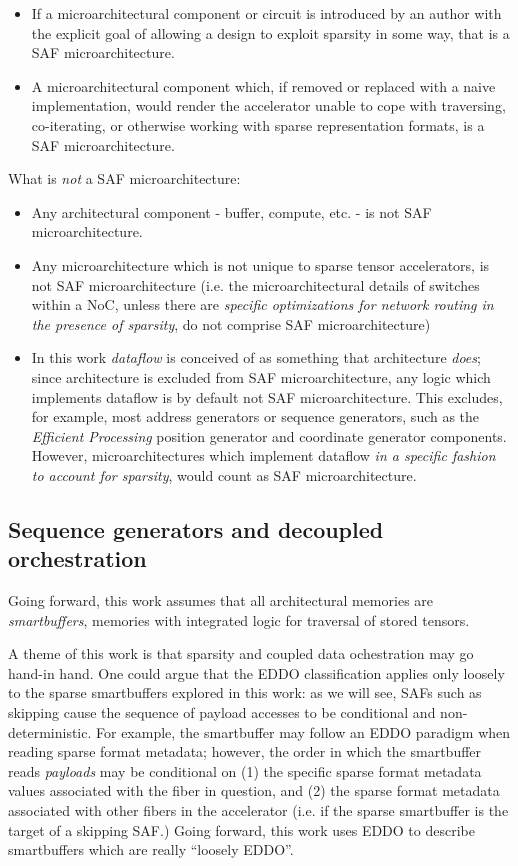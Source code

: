 \begin{itemize}
    \item If a microarchitectural component or circuit is introduced by an author with the explicit goal of allowing a design to exploit sparsity in some way, that is a SAF microarchitecture.
    \item A microarchitectural component which, if removed or replaced with a naive implementation, would render the accelerator unable to cope with traversing, co-iterating, or otherwise working with sparse representation formats, is a SAF microarchitecture.
\end{itemize}

What is \textit{not} a SAF microarchitecture:

\begin{itemize}
    \item Any architectural component - buffer, compute, etc. - is not SAF microarchitecture.
    \item Any microarchitecture which is not unique to sparse tensor accelerators, is not SAF microarchitecture (i.e. the microarchitectural details of switches within a NoC, unless there are \textit{specific optimizations for network routing in the presence of sparsity}, do not comprise SAF microarchitecture)
    \item In this work \textit{dataflow} is conceived of as something that architecture \textit{does}; since architecture is excluded from SAF microarchitecture, any logic which implements dataflow is by default not SAF microarchitecture. This excludes, for example, most address generators or sequence generators, such as the \textit{Efficient Processing} position generator and coordinate generator components. However, microarchitectures which implement dataflow \textit{in a specific fashion to account for sparsity}, would count as SAF microarchitecture.
\end{itemize}

\subsection{Sequence generators and decoupled orchestration}

Going forward, this work assumes that all architectural memories are \textit{smartbuffers}\cite{smartbuffer}, memories with integrated logic for traversal of stored tensors.

A theme of this work is that sparsity and coupled data ochestration may go hand-in hand. One could argue that the EDDO classification applies only loosely to the sparse smartbuffers explored in this work: as we will see, SAFs such as skipping cause the sequence of payload accesses to be conditional and non-deterministic. For example, the smartbuffer may follow an EDDO paradigm when reading sparse format metadata; however, the order in which the smartbuffer reads \textit{payloads} may be conditional on (1) the specific sparse format metadata values associated with the fiber in question, and (2) the sparse format metadata associated with other fibers in the accelerator (i.e. if the sparse smartbuffer is the target of a skipping SAF.) Going forward, this work uses EDDO to describe smartbuffers which are really ``loosely EDDO''.


